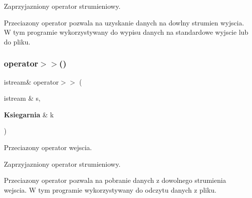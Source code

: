 Zaprzyjazniony operator strumieniowy.

Przeciazony operator pozwala na uzyskanie danych na dowlny strumien wyjscia. W tym programie wykorzystywany do wypisu danych na standardowe wyjscie lub do pliku. \mbox{\label{_ksiegarnia_8cpp_a874d3c67b99342ced9734d8a4c001ddf}} 
\subsubsection{operator$>$$>$()}
{\footnotesize\ttfamily istream\& operator$>$$>$ (\begin{DoxyParamCaption}\item[{istream \&}]{s,  }\item[{\textbf{ Ksiegarnia} \&}]{k }\end{DoxyParamCaption})}



Przeciazony operator wejscia. 

Zaprzyjazniony operator strumieniowy.

Przeciazony operator pozwala na pobranie danych z dowolnego strumienia wejscia. W tym programie wykorzystywany do odczytu danych z pliku. 